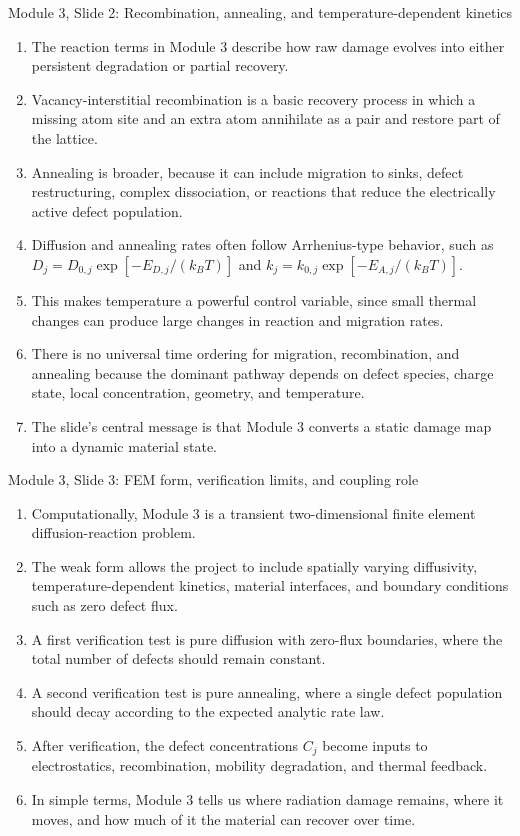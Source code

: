 \documentclass[11pt]{article}
\begin{document}
\begin{slidebox}{Module 3, Slide 2: Recombination, annealing, and temperature-dependent kinetics}
\begin{enumerate}
\item The reaction terms in Module 3 describe how raw damage evolves into either persistent degradation or partial recovery.
\item Vacancy-interstitial recombination is a basic recovery process in which a missing atom site and an extra atom annihilate as a pair and restore part of the lattice.
\item Annealing is broader, because it can include migration to sinks, defect restructuring, complex dissociation, or reactions that reduce the electrically active defect population.
\item Diffusion and annealing rates often follow Arrhenius-type behavior, such as \(D_j=D_{0,j}\exp[-E_{D,j}/(k_BT)]\) and \(k_j=k_{0,j}\exp[-E_{A,j}/(k_BT)]\).
\item This makes temperature a powerful control variable, since small thermal changes can produce large changes in reaction and migration rates.
\item There is no universal time ordering for migration, recombination, and annealing because the dominant pathway depends on defect species, charge state, local concentration, geometry, and temperature.
\item The slide's central message is that Module 3 converts a static damage map into a dynamic material state.
\end{enumerate}
\end{slidebox}

\begin{slidebox}{Module 3, Slide 3: FEM form, verification limits, and coupling role}
\begin{enumerate}
\item Computationally, Module 3 is a transient two-dimensional finite element diffusion-reaction problem.
\item The weak form allows the project to include spatially varying diffusivity, temperature-dependent kinetics, material interfaces, and boundary conditions such as zero defect flux.
\item A first verification test is pure diffusion with zero-flux boundaries, where the total number of defects should remain constant.
\item A second verification test is pure annealing, where a single defect population should decay according to the expected analytic rate law.
\item After verification, the defect concentrations \(C_j\) become inputs to electrostatics, recombination, mobility degradation, and thermal feedback.
\item In simple terms, Module 3 tells us where radiation damage remains, where it moves, and how much of it the material can recover over time.
\end{enumerate}
\end{slidebox}
\end{document}
